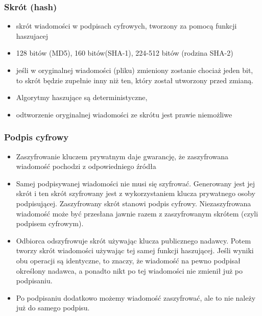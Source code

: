 \documentclass[../main.tex]{subfiles}
\begin{document}
    \subsubsection{Skrót (hash)}
    \begin{itemize}
        \item skrót wiadomości w podpisach cyfrowych, tworzony za pomocą funkcji haszujacej
        \item 128 bitów (MD5), 160 bitów(SHA-1), 224-512 bitów (rodzina SHA-2)
        \item jeśli w oryginalnej wiadomości (pliku)
        zmieniony zostanie chociaż jeden bit, to skrót będzie zupełnie inny niż ten, który został
        utworzony przed zmianą.
        \item  Algorytmy haszujące są deterministyczne,
        \item odtworzenie oryginalnej wiadomości ze skrótu jest prawie niemożliwe
    \end{itemize}



    \subsubsection{Podpis cyfrowy}
    \begin{itemize}
        \item Zaszyfrowanie kluczem prywatnym daje gwarancję, że zaszyfrowana wiadomość pochodzi z
        odpowiedniego źródła
        \item Samej podpisywanej wiadomości nie musi się szyfrować. Generowany jest jej skrót
        i ten skrót szyfrowany jest z wykorzystaniem klucza
        prywatnego osoby podpisującej. Zaszyfrowany skrót stanowi podpis cyfrowy. Niezaszyfrowana wiadomość może być przesłana jawnie razem z zaszyfrowanym skrótem
        (czyli podpisem cyfrowym).
        \item Odbiorca odszyfrowuje skrót używając klucza
        publicznego nadawcy. Potem tworzy skrót wiadomości używając tej samej funkcji haszującej. Jeśli wyniki
        obu operacji są identyczne, to znaczy, że wiadomość na pewno
        podpisał określony nadawca, a ponadto nikt po tej wiadomości nie zmienił już po podpisaniu.
        \item Po podpisaniu dodatkowo możemy wiadomość zaszyfrować, ale to nie
        należy już do samego podpisu.
    \end{itemize}
\end{document}
